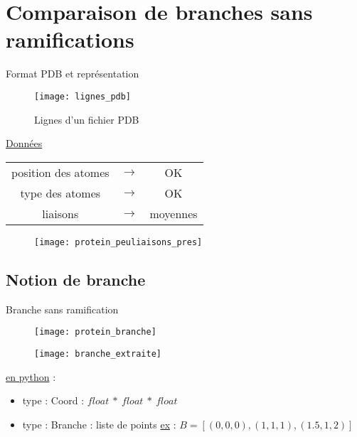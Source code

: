 \section{Comparaison de branches sans ramifications}
\begin{frame}{Format PDB et représentation}
    \footnotesize
    \begin{figure}[!htb]
        \centering
        \texttt{[image: lignes\_pdb]}
        \caption{\label{fig:pdb}Lignes d'un fichier PDB}
    \end{figure}
    \begin{minipage}{0.45\textwidth}%
    \begin{center}
        \underline{Données}
    \end{center}
    \begin{tabular}{ccc}
    position des atomes & $\rightarrow$ & OK \\
    type des atomes & $\rightarrow$ & OK \\
    liaisons & $\rightarrow$ & moyennes
    \end{tabular}
    \end{minipage}%
    \hfill
    \begin{minipage}{0.45\textwidth}%
    \begin{figure}[!htb]
        \centering
        \texttt{[image: protein\_peuliaisons\_pres]}
    \end{figure}
    \end{minipage}%
\end{frame}

\subsection{Notion de branche}
\begin{frame}{Branche sans ramification}
    \begin{minipage}{0.5\textwidth}%
        \begin{figure}[!htb]
            \centering
            \texttt{[image: protein\_branche]}
        \end{figure}
    \end{minipage}%
    \hfill
    \begin{minipage}{0.4\textwidth}%
        \begin{figure}[!htb]
            \centering
            \texttt{[image: branche\_extraite]}
        \end{figure}
    \end{minipage}%
    \newline \newline \newline
    \underline{en python} : 
    \begin{itemize}
        \item type : \textcolor{airforceblue}{Coord} : $float\ *\ float\ *\ float$
        \item type : \textcolor{airforceblue}{Branche} : liste de points 
            \newline \underline{ex} : $B = [(0,0,0), (1,1,1), (1.5,1,2)]$
    \end{itemize}
\end{frame}

